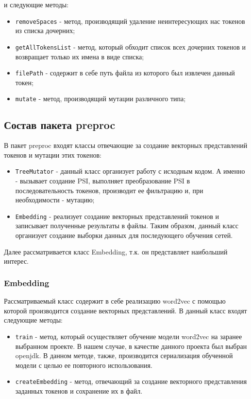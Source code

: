 и следующие методы:

\begin{itemize}
\setlength\itemsep{0mm}
\item \texttt{removeSpaces} - метод, производящий удаление неинтересующих нас токенов из списка дочерних;
\item \texttt{getAllTokensList} - метод, который обходит список всех дочерних токенов и возвращает только их имена в виде списка;
\item \texttt{filePath} - содержит в себе путь файла из которого был извлечен данный токен;
\item \texttt{mutate} - метод, производящий мутации различного типа;
\end{itemize}

\subsection{Состав пакета preproc}

В пакет preproc	входят классы отвечающие за создание векторных представлений токенов и мутации этих токенов:

\begin{itemize}
\setlength\itemsep{0mm}
\item \texttt{TreeMutator} - данный класс организует работу с исходным кодом. А именно - вызывает создание PSI, выполняет преобразование PSI в последовательность токенов, производит ее фильтрацию и, при необходимости - мутацию;
\item \texttt{Embedding} - реализует создание векторных представлений токенов и записывает полученные результаты в файлы. Таким образом, данный класс организует создание выборки данных для последующего обучения сетей.
\end{itemize}

Далее рассматривается класс Embedding, т.к. он представляет наибольший интерес.

\subsubsection{Embedding}

Рассматриваемый класс содержит в себе реализацию word2vec с помощью которой производится создание векторных представлений. В данный класс входят следующие методы:

\begin{itemize}
\setlength\itemsep{0mm}
\item \texttt{train} - метод, который осуществляет обучение модели word2vec на заранее выбранном проекте. В нашем случае, в качестве данного проекта был выбран openjdk. В данном методе, также, производится сериализация обученной модели с целью ее повторного использования. 
\item \texttt{createEmbedding} - метод, отвечающий за создание векторного представления заданных токенов и сохранение их в файл.
\end{itemize}

